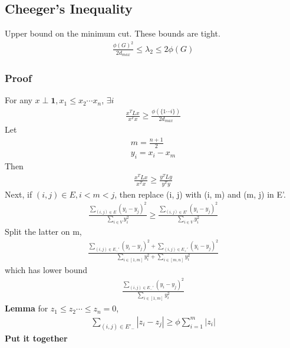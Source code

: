 \documentclass[12pt, letterpaper]{report}
\begin{document}
    \subsection{Cheeger's Inequality}
    Upper bound on the minimum cut. These bounds are tight.
    \begin{gather*}
        \frac{\phi(G)^2}{2d_{max}}\leq \lambda_2 \leq 2\phi(G)
    \end{gather*}
    \subsubsection{Proof}
    For any $x\perp \mathbf{1}, x_1\leq x_2 \cdots x_n$, $\exists i$
    \begin{gather*}
        \frac{x^T Lx}{x^Tx} \geq \frac{\phi(\{1\cdots i\})}{2d_{max}}
    \end{gather*}
    Let
    \begin{gather*}
        m = \frac{n+1}{2}\\
        y_i=x_i-x_m
    \end{gather*}
    Then
    \begin{gather*}
        \frac{x^TLx}{x^Tx} \geq \frac{y^TLy}{y^Ty}
    \end{gather*}
    Next, if $(i,j)\in E, i<m<j$, then replace (i, j) with (i, m) and (m, j) in E'.
    \begin{gather*}
        \frac{\sum_{(i,j)\in E}(y_i-y_j)^2}{\sum_{i\in V}y_i^2} \geq \frac{\sum_{(i,j)\in E'}(y_i-y_j)^2}{\sum_{i\in V}y_i^2}
    \end{gather*}
    Split the latter on m,
    \begin{gather*}
        \frac{\sum_{(i,j)\in E_{-}'}(y_i-y_j)^2+\sum_{(i,j)\in E_{+}'}(y_i-y_j)^2}{\sum_{i\in [1,m]}y_i^2+\sum_{i\in [m,n]}y_i^2}
    \end{gather*}
    which has lower bound
    \begin{gather*}
        \frac{\sum_{(i,j)\in E_{-}'}(y_i-y_j)^2}{\sum_{i\in [1,m]}y_i^2}
    \end{gather*}
    \textbf{Lemma} for $z_1\leq z_2 \cdots \leq z_n = 0$, 
    \begin{gather*}
        \sum_{(i,j)\in E'_{-}}|z_i-z_j|\geq \phi \sum_{i=1}^{m}|z_i|
    \end{gather*}
    \textbf{Put it together}
\end{document}

